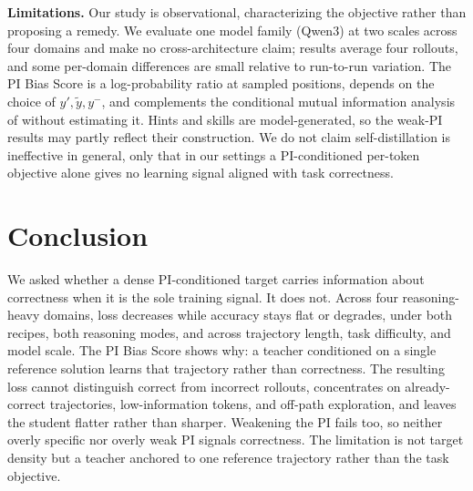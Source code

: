\documentclass{article}
\newcommand{\yalt}{y'}                        %
\newcommand{\ywrong}{y^{-}}                  %
\newcommand{\yother}{\tilde{y}}              %
\begin{document}
\textbf{Limitations.} Our study is observational, characterizing the objective rather than proposing a remedy. We evaluate one model family (Qwen3) at two scales across four domains and make no cross-architecture claim; results average four rollouts, and some per-domain differences are small relative to run-to-run variation. The PI Bias Score is a log-probability ratio at sampled positions, depends on the choice of $\yalt,\yother,\ywrong$, and complements the conditional mutual information analysis of \citet{rlsd2025} without estimating it. Hints and skills are model-generated, so the weak-PI results may partly reflect their construction. We do not claim self-distillation is ineffective in general, only that in our settings a PI-conditioned per-token objective alone gives no learning signal aligned with task correctness.
\vspace{-5pt}
\section{Conclusion}
\label{sec:conclusion}
We asked whether a dense PI-conditioned target carries information about correctness when it is the sole training signal. It does not. Across four reasoning-heavy domains, loss decreases while accuracy stays flat or degrades, under both recipes, both reasoning modes, and across trajectory length, task difficulty, and model scale. The PI Bias Score shows why: a teacher conditioned on a single reference solution learns that trajectory rather than correctness. The resulting loss cannot distinguish correct from incorrect rollouts, concentrates on already-correct trajectories, low-information tokens, and off-path exploration, and leaves the student flatter rather than sharper. Weakening the PI fails too, so neither overly specific nor overly weak PI signals correctness. The limitation is not target density but a teacher anchored to one reference trajectory rather than the task objective.


\end{document}
